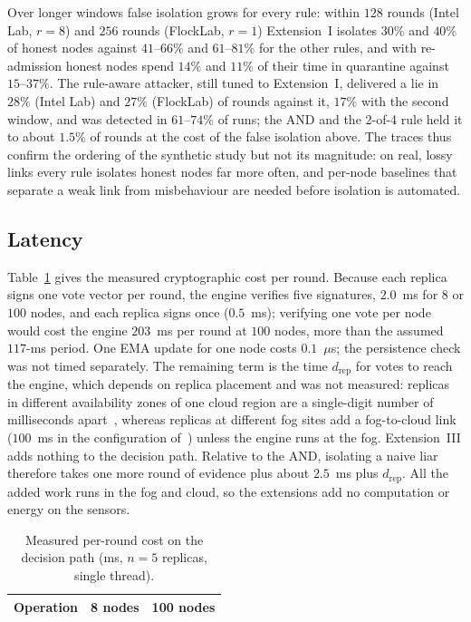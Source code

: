 Over longer windows false isolation grows for every rule: within $128$
rounds (Intel Lab, $r=8$) and $256$ rounds (FlockLab, $r=1$) Extension~I
isolates $30\%$ and $40\%$ of honest nodes against $41$--$66\%$ and
$61$--$81\%$ for the other rules, and with re-admission honest nodes
spend $14\%$ and $11\%$ of their time in quarantine against
$15$--$37\%$.  The rule-aware attacker, still tuned to Extension~I,
delivered a lie in $28\%$ (Intel Lab) and $27\%$ (FlockLab) of rounds
against it, $17\%$ with the second window, and was detected in
$61$--$74\%$ of runs; the AND and the 2-of-4 rule held it to about
$1.5\%$ of rounds at the cost of the false isolation above.  The
traces thus confirm the ordering of the synthetic study but not its
magnitude: on real, lossy links every rule isolates honest nodes far
more often, and per-node baselines that separate a weak link from
misbehaviour are needed before isolation is automated.

\subsection{Latency}
\label{sec:res-latency}
Table~\ref{tab:latency} gives the measured cryptographic cost per round.
Because each replica signs one vote vector per round, the engine
verifies five signatures, $2.0$~ms for $8$ or $100$ nodes, and each
replica signs once ($0.5$~ms); verifying one vote per node would cost the
engine $203$~ms per round at $100$ nodes, more than the assumed
$117$-ms period.  One EMA update for one node costs
$0.1$~$\mu$s; the persistence check was not timed separately.  The remaining term is the time
$d_{\mathrm{rep}}$ for votes to reach the engine, which depends on
replica placement and was not measured: replicas in different
availability zones of one cloud region are a single-digit number of
milliseconds apart~\cite{aws2024az}, whereas replicas at different fog
sites add a fog-to-cloud link ($100$~ms in the configuration
of~\cite{soula2024iodt}) unless the engine runs at the fog.
Extension~III adds nothing to the decision path.  Relative to the AND,
isolating a naive liar therefore takes one more round of evidence plus
about $2.5$~ms plus $d_{\mathrm{rep}}$.  All the added work runs in the
fog and cloud, so the extensions add no computation or energy on the
sensors.

\begin{table}[!t]
\caption{Measured per-round cost on the decision path (ms, $n=5$ replicas, single thread).}
\label{tab:latency}
\centering
\renewcommand{\arraystretch}{1.08}
\footnotesize
\setlength{\tabcolsep}{3pt}
\begin{tabular}{lrr}
\toprule
\textbf{Operation} & \textbf{8 nodes} & \textbf{100 nodes} \\
\midrule
\bottomrule
\end{tabular}
\end{table}

